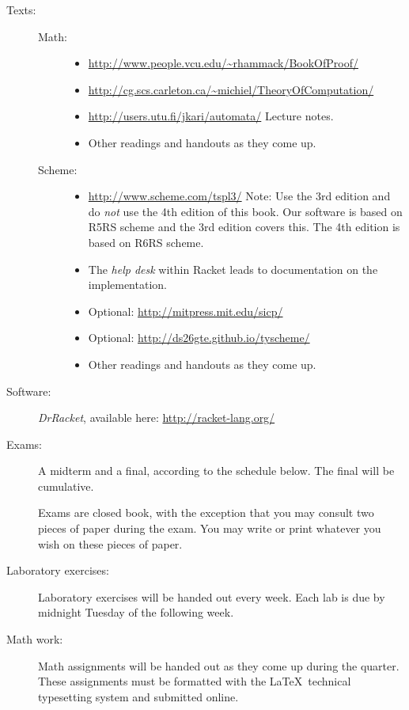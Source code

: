 \documentclass{article}
\begin{document}
\begin{description}
\item[Texts:] \mbox{}
  \begin{description}
    \item[Math:] \mbox{}
\begin{itemize}
\item \url{http://www.people.vcu.edu/~rhammack/BookOfProof/}
\item \url{http://cg.scs.carleton.ca/~michiel/TheoryOfComputation/}
\item  \url{http://users.utu.fi/jkari/automata/} Lecture notes.
\item Other readings and handouts as they come up.
\end{itemize}
\item[Scheme:] \mbox{}
  \begin{itemize}
  \item  \url{http://www.scheme.com/tspl3/}  Note: Use the 3rd edition
  and do {\em not} use the
  4th edition of this book.  Our software is based on R5RS scheme and
  the 3rd edition covers this.  The 4th edition is based on R6RS scheme.
  \item The {\em help desk} within Racket leads to documentation on
    the implementation.
  \item  Optional:  \url{http://mitpress.mit.edu/sicp/}
\item Optional: \url{http://ds26gte.github.io/tyscheme/} 
\item Other readings and handouts as they come up.
  \end{itemize}
  \end{description}

\item[Software:] {\em DrRacket}, available here: 
\url{http://racket-lang.org/}

\item[Exams:] A midterm and a final, according to the schedule below.
  The final will be cumulative.

  Exams are closed book, with the exception that you may consult two
  pieces of paper during the exam.  You may write or print whatever
  you wish on these pieces of paper.

\item[Laboratory exercises:]
Laboratory exercises  will be handed out every week.
Each lab is due by midnight Tuesday of the following week.

\item[Math work:] Math assignments will be handed out as they come up
  during the quarter.  These assignments must be formatted with the
  \LaTeX\ technical typesetting system and submitted online.


\end{description}
\end{document}
